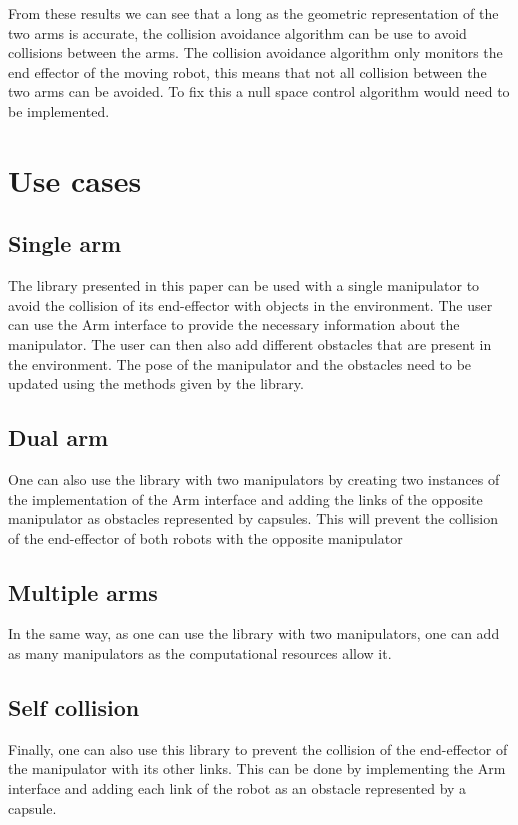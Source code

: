 \documentclass[a4paper, 10pt, conference]{ieeeconf}      %
\begin{document}
\pagebreak
From these results we can see that a long as the geometric representation of the two arms is accurate, the collision avoidance algorithm can be use to avoid collisions between the arms. The collision avoidance algorithm only monitors the end effector of the moving robot, this means that not all collision between the two arms can be avoided. To fix this a null space control algorithm would need to be implemented. 

\section{Use cases}

\subsection{Single arm} %
The library presented in this paper can be used with a single manipulator to avoid the collision of its end-effector with objects in the environment.
The user can use the Arm interface to provide the necessary information about the manipulator.
The user can then also add different obstacles that are present in the environment.
The pose of the manipulator and the obstacles need to be updated using the methods given by the library.
\subsection{Dual arm} %
One can also use the library with two manipulators by creating two instances of the implementation of the Arm interface and adding the links of 
the opposite manipulator as obstacles represented by capsules.
This will prevent the collision of the end-effector of both robots with the opposite manipulator
\subsection{Multiple arms}
In the same way, as one can use the library with two manipulators, one can add as many manipulators as the computational resources allow it.
\subsection{Self collision} %
Finally, one can also use this library to prevent the collision of the end-effector of the manipulator with its other links.
This can be done by implementing the Arm interface and adding each link of the robot as an obstacle represented by a capsule.
\end{document}
